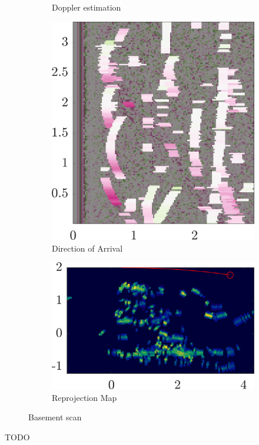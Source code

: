 \begin{figure}
\begin{subfigure}[b]{0.25\textwidth}
        \caption{\small Doppler estimation}
    \end{subfigure}%
    \begin{subfigure}[b]{0.25\textwidth}   
        \centering 
        \includegraphics[width=.9\textwidth]{gfx/results/basement_doa.png}
        \caption{\small Direction of Arrival}
    \end{subfigure}%
    \begin{subfigure}[b]{0.25\textwidth}   
        \centering 
        \includegraphics[width=.9\textwidth]{gfx/results/basement_reprojection.png}
        \caption{\small Reprojection Map}
    \end{subfigure}%
    \caption{Basement scan}
\end{figure}

TODO

